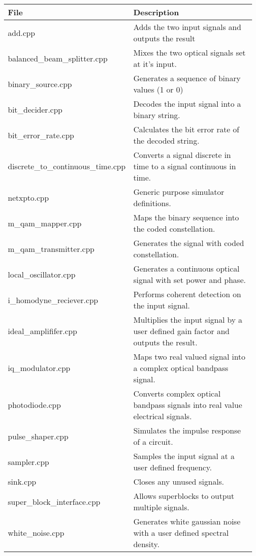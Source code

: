 \begin{table}[H]
\centering
\begin{tabulary}{1.0\textwidth}{|L|L|}
\hline
\textbf{File}              & \textbf{Description} 				                  \\ \hline
add.cpp                      & Adds the two input signals and outputs the result    \\ \hline
balanced\_beam\_splitter.cpp & Mixes the two optical signals set at it's input.     \\ \hline
binary\_source.cpp           & Generates a sequence of binary values (1 or 0)       \\ \hline
bit\_decider.cpp            & Decodes the input signal into a binary string.       \\ \hline
bit\_error\_rate.cpp         & Calculates the bit error rate of the decoded string. \\ \hline
discrete\_to\_continuous\_time.cpp &  Converts a signal discrete in time to a signal continuous in time. \\ \hline
netxpto.cpp                  & Generic purpose simulator definitions.	              \\ \hline
m\_qam\_mapper.cpp           & Maps the binary sequence into the coded constellation. \\ \hline
m\_qam\_transmitter.cpp      & Generates the signal with coded constellation.       \\ \hline
local\_oscillator.cpp        & Generates a continuous optical signal with set power and phase. \\ \hline
i\_homodyne\_reciever.cpp    & Performs coherent detection on the input signal.     \\ \hline
ideal\_amplififer.cpp        & Multiplies the input signal by a user defined gain factor and outputs the result. \\ \hline
iq\_modulator.cpp            & Maps two real valued signal into a complex optical bandpass  signal. \\ \hline
photodiode.cpp               & Converts complex optical bandpass signals into real value electrical signals. \\ \hline
pulse\_shaper.cpp            & Simulates the impulse response of a circuit.          \\ \hline
sampler.cpp                  & Samples the input signal at a user defined frequency. \\ \hline
sink.cpp                     & Closes any unused signals.                           \\ \hline
super\_block\_interface.cpp  & Allows superblocks to output multiple signals.       \\ \hline
white\_noise.cpp             & Generates white gaussian noise with a user defined spectral density.\\ \hline
\end{tabulary}
\end{table}		

